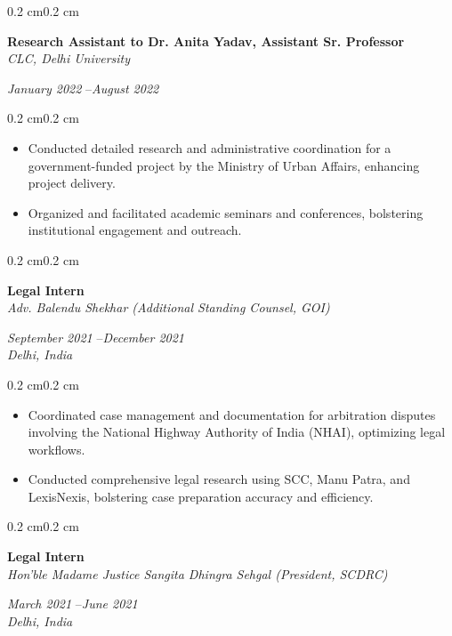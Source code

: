 \documentclass[10pt, letterpaper]{article}
\newenvironment{highlights}{%
    \begin{itemize}[
        topsep=0.10 cm,%
        parsep=0.10 cm,%
        partopsep=0pt,%
        itemsep=0pt,%
        leftmargin=0.4 cm + 10pt%
    ]
}{%
    \end{itemize}%
}
\newenvironment{onecolentry}{%
    \begin{adjustwidth}{0.2 cm}{0.2 cm}%
}{%
    \end{adjustwidth}%
}
\newenvironment{twocolentry}[1]{%
    \begin{onecolentry}%
    \def\twocolentryarg{#1}%
    \noindent
    \begin{minipage}[t]{0.68\textwidth} %
}{%
    \end{minipage}\hfill%
    \begin{minipage}[t]{0.30\textwidth} %
      \raggedleft\twocolentryarg
    \end{minipage}%
    \vspace{0.2cm}%
    \end{onecolentry}%
}
\begin{document}
\vspace{0.2 cm}
\begin{twocolentry}{%
\textit{January 2022 }--\textit{August 2022} \\[0.1cm]
\textit{}%
}
    \textbf{Research Assistant to Dr. Anita Yadav, Assistant Sr. Professor }\\
    \textit{CLC, Delhi University }
\end{twocolentry}
\vspace{0.10 cm}
\begin{onecolentry}
    \begin{highlights}
        \item Conducted detailed research and administrative coordination for a government-funded project by the Ministry of Urban Affairs, enhancing project delivery.
        \item Organized and facilitated academic seminars and conferences, bolstering institutional engagement and outreach.
    \end{highlights}
\end{onecolentry}
\vspace{0.2 cm}
\begin{twocolentry}{%
\textit{September 2021 }--\textit{December 2021} \\[0.1cm]
\textit{Delhi, India}%
}
    \textbf{Legal Intern }\\
    \textit{Adv. Balendu Shekhar (Additional Standing Counsel, GOI) }
\end{twocolentry}
\vspace{0.10 cm}
\begin{onecolentry}
    \begin{highlights}
        \item Coordinated case management and documentation for arbitration disputes involving the National Highway Authority of India (NHAI), optimizing legal workflows.
        \item Conducted comprehensive legal research using SCC, Manu Patra, and LexisNexis, bolstering case preparation accuracy and efficiency.
    \end{highlights}
\end{onecolentry}
\vspace{0.2 cm}
\begin{twocolentry}{%
\textit{March 2021 }--\textit{June 2021} \\[0.1cm]
\textit{Delhi, India}%
}
    \textbf{Legal Intern }\\
    \textit{Hon’ble Madame Justice Sangita Dhingra Sehgal (President, SCDRC) }
\end{twocolentry}
\end{document}
